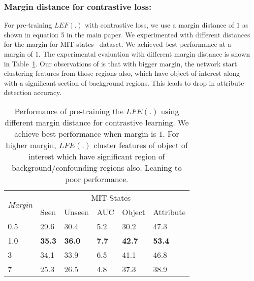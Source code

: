 \documentclass{bmvc2k}
\newcommand{\tablelightgray}{\rowcolor[gray]{.95}}
\begin{document}
\subsubsection{Margin distance for contrastive loss:} For pre-training $LEF(.)$ with contrastive loss, we use a margin distance of $1$ as shown in equation 5 in the main paper. We experimented with different distances for the margin for MIT-states~\cite{isola2015discovering} dataset. We achieved best performance at a margin of 1. The experimental evaluation with different margin distance is shown in Table~\ref{tab:margin}. Our observations of is that with bigger margin, the network start clustering features from those regions also, which have object of interest along with a significant section of background regions. This leads to drop in attribute detection accuracy.

\begin{table}[h]
\centering
\begin{tabular}{l|lllll}

\multirow{2}{*}{\textit{Margin}} & \multicolumn{5}{c}{MIT-States~\cite{isola2015discovering}}                                                                                                                                  \\ 
                                 & \multicolumn{1}{l|}{Seen}          & \multicolumn{1}{l|}{Unseen}        & \multicolumn{1}{l|}{AUC}          & \multicolumn{1}{l|}{Object}        & Attribute     \\ \hline
\tablelightgray
0.5                              & \multicolumn{1}{l|}{29.6}          & \multicolumn{1}{l|}{30.4}          & \multicolumn{1}{l|}{5.2}          & \multicolumn{1}{l|}{30.2}          & 47.3          \\ 
1.0                              & \multicolumn{1}{l|}{\textbf{35.3}} & \multicolumn{1}{l|}{\textbf{36.0}} & \multicolumn{1}{l|}{\textbf{7.7}} & \multicolumn{1}{l|}{\textbf{42.7}} & \textbf{53.4} \\ 
\tablelightgray
3                                & \multicolumn{1}{l|}{34.1}          & \multicolumn{1}{l|}{33.9}          & \multicolumn{1}{l|}{6.5}          & \multicolumn{1}{l|}{41.1}          & 46.8          \\ 
7                                & \multicolumn{1}{l|}{25.3}          & \multicolumn{1}{l|}{26.5}          & \multicolumn{1}{l|}{4.8}          & \multicolumn{1}{l|}{37.3}          & 38.9          \\ 
\end{tabular}
\vspace{0.1cm}
\caption{Performance of pre-training the $LFE(.)$ using different margin distance for contrastive learning. We achieve best performance when margin is $1$. For higher margin, $LFE(.)$ cluster features of object of interest which have significant region of background/confounding regions also. Leaning to poor performance.}
\label{tab:margin}
\vspace{-0.4cm}
\end{table}
\end{document}
